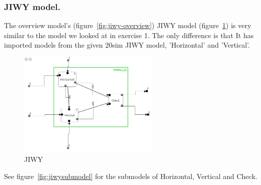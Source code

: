 \documentclass[a4paper,twoside,11pt]{article}
\begin{document}
\subsubsection{JIWY model.}
The overview model's (figure~\ref{fig:jiwy-overview}) JIWY model (figure~\ref{fig:jiwy-jiwy}) 
is very similar to the model we looked at in exercise 1. The only difference is that 
It has imported models from the given 20sim JIWY model, 'Horizontal' and 'Vertical'.
\begin{figure}[h]
	\centering
		\includegraphics[width=0.6\textwidth]{./img/jiwy-jiwy.png}
		\caption{JIWY}
		\label{fig:jiwy-jiwy}
\end{figure}

See figure~\ref{fig:jiwysubmodel} for the submodels of Horizontal, Vertical and Check.
\end{document}
